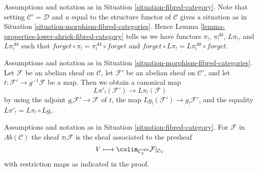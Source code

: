 \begin{remark}
\label{remark-fibred-category}
Assumptions and notation as in Situation \ref{situation-fibred-category}.
Note that setting $\mathcal{C}' = \mathcal{D}$ and $u$ equal to the
structure functor of $\mathcal{C}$ gives a situation as in
Situation \ref{situation-morphism-fibred-categories}. Hence
Lemma \ref{lemma-properties-lower-shriek-fibred-category}
tells us we have functors  $\pi_!$, $\pi_!^{\textit{Ab}}$, $L\pi_!$, and
$L\pi_!^{\textit{Ab}}$ such that
$forget \circ \pi_! = \pi_!^{\textit{Ab}} \circ forget$ and
$forget \circ L\pi_! = L\pi_!^{\textit{Ab}} \circ forget$.
\end{remark}

\begin{remark}
\label{remark-morphism-fibred-categories}
Assumptions and notation as in
Situation \ref{situation-morphism-fibred-categories}.
Let $\mathcal{F}$ be an abelian sheaf on $\mathcal{C}$,
let $\mathcal{F}'$ be an abelian sheaf on $\mathcal{C}'$,
and let $t : \mathcal{F}' \to g^{-1}\mathcal{F}$ be a map.
Then we obtain a canonical map
$$
L\pi'_!(\mathcal{F}') \longrightarrow L\pi_!(\mathcal{F})
$$
by using the adjoint $g_!\mathcal{F}' \to \mathcal{F}$ of $t$,
the map $Lg_!(\mathcal{F}') \to g_!\mathcal{F}'$, and the
equality $L\pi'_! = L\pi_! \circ Lg_!$.
\end{remark}

\begin{lemma}
\label{lemma-compute-pi-shriek}
Assumptions and notation as in
Situation \ref{situation-fibred-category}.
For $\mathcal{F}$ in $\textit{Ab}(\mathcal{C})$
the sheaf $\pi_!\mathcal{F}$ is the
sheaf associated to the presheaf
$$
V \longmapsto \colim_{\mathcal{C}_V^{opp}} \mathcal{F}|_{\mathcal{C}_V}
$$
with restriction maps as indicated in the proof.
\end{lemma}


